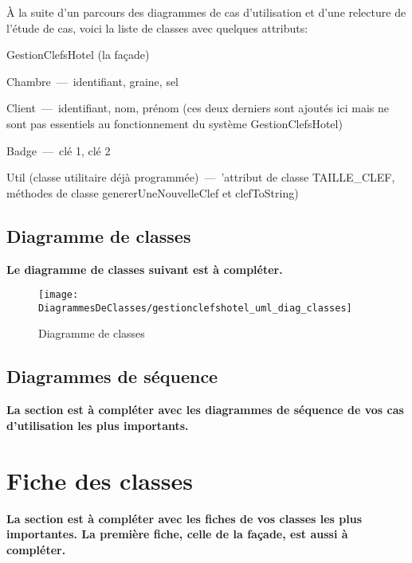 \documentclass[11pt,article]{article}
\begin{document}
À la suite d'un parcours des diagrammes de cas d'utilisation et d'une
relecture de l'étude de cas, voici la liste de classes avec quelques
attributs:
\begin{compactitem}
\item \textsf{GestionClefsHotel} (la façade)
\item \textsf{Chambre}~---~identifiant, graine, sel
\item \textsf{Client}~---~identifiant, nom, prénom (ces deux derniers
  sont ajoutés ici mais ne sont pas essentiels au fonctionnement du
  système \textsf{GestionClefsHotel})
\item \textsf{Badge}~---~clé 1, clé 2
\item \textsf{Util} (classe utilitaire déjà programmée)~---~'attribut
  de classe \textsf{TAILLE\_CLEF}, méthodes de classe
  \textsf{genererUneNouvelleClef} et \textsf{clefToString})
\end{compactitem}
\newpage

\subsection{Diagramme de classes}

{\color{red}\textbf{Le diagramme de classes suivant est à compléter.}}

\begin{figure}[h!]
\begin{center}
\texttt{[image: DiagrammesDeClasses/gestionclefshotel\_uml\_diag\_classes]}
\caption{Diagramme de classes}
\end{center}
\label{umlet_diag_classes}
\end{figure}

\newpage

\subsection{Diagrammes de séquence}

{\color{red}\textbf{La section est à compléter avec les diagrammes de séquence de vos cas d'utilisation les plus importants.}}

\newpage

\section{Fiche des classes}

{\color{red}\textbf{La section est à compléter avec les fiches de vos
    classes les plus importantes. La première fiche, celle de la
    façade, est aussi à compléter.}}
\end{document}
